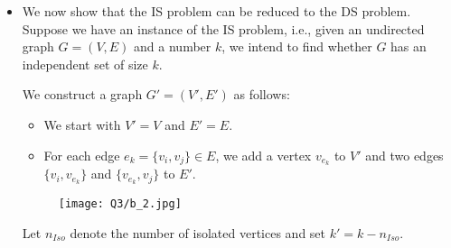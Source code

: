 \documentclass[11pt, fleqn]{article}
\begin{document}
\begin{itemize}
\begin{proof}
\begin{itemize}
            For every vertex $v_i$ in $V - D = \{v_i | u_i \in I'\}$,
            \begin{itemize}[noitemsep]
                \item if no vertex corresponding to the clique $v_{i*}$ is in $I$, then we can replace $u_i$ with $v_{ii}$, thus adding $v_i$ to $D$. (Remember that, as we can never have more than one vertex per clique in $I$, size of $D$ never exceeds $k$.)
                \item if there is a vertex corresponding to the clique $v_{i*}$ in $I$, say $v_{ij}$, then we know for sure that $\{v_i, v_j\} \in E$, by construction of $G'$ and that $u_j \notin I'$, due to independence constraint (we have an edge joining $u_j$ and $v_{ij}$ by construction of $G'$). As $u_j \notin I'$, $v_j \in D$ and we found an adjacent vertex for $v_i \notin D$.
            \end{itemize}
            
            Since we showed that we showed that for every vertex not in $D$ we can either find an adjacent vertex in $D$ or include it in $D$ with maintaining the size at most $k$. $D$ is a at most $k$-sized dominating set of $G$.
            
        \end{itemize}
    \end{proof}
    With this, we conclude that the DS problem can be reduced to the independent set problem.
    
    \item We now show that the IS problem can be reduced to the DS problem. Suppose we have an instance of the IS problem, i.e., given an undirected graph $G = (V, E)$ and a number $k$, we intend to find whether $G$ has an independent set of size $k$.
    
    We construct a graph $G' = (V', E')$ as follows:
    \begin{itemize}
        \item We start with $V' = V$ and $E' = E$.
        \item For each edge $e_k = \{v_i, v_j\} \in E$, we add a vertex $v_{e_k}$ to $V'$ and two edges $\{v_i, v_{e_k}\}$ and $\{v_{e_k}, v_j\}$ to $E'$.
    \end{itemize}
    \begin{figure}[H]
        \texttt{[image: Q3/b\_2.jpg]}
    \end{figure}
    
    Let $n_{Iso}$ denote the number of isolated vertices and set $k' = k - n_{Iso}$.
    

\end{itemize}
\end{document}

